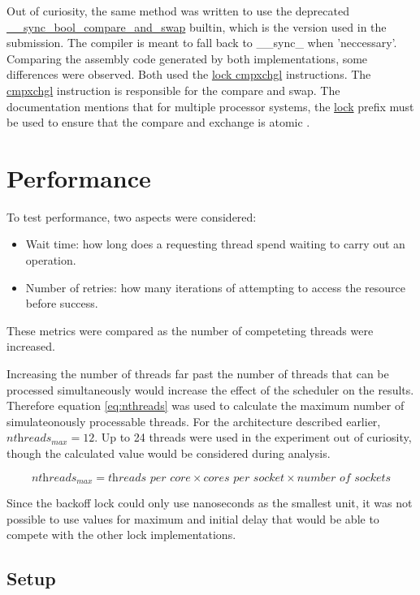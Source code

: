 \documentclass[12pt]{article}
\begin{document}
Out of curiosity, the same method was written to use the deprecated \url{__sync_bool_compare_and_swap} builtin, which is the version used in the submission. The compiler is meant to fall back to \_\_sync\_ when 'neccessary'. Comparing the assembly code generated by both implementations, some differences were observed. Both used the \url{lock cmpxchgl} instructions. The \url{cmpxchgl} instruction is responsible for the compare and swap. The documentation mentions that for multiple processor systems, the \url{lock} prefix must be used to ensure that the compare and exchange is atomic \cite{intelAtomic}.

\section{Performance}

To test performance, two aspects were considered:

\begin{itemize}
\item Wait time: how long does a requesting thread spend waiting to carry out an operation.
\item Number of retries: how many iterations of attempting to access the resource before success.
\end{itemize}

\noindent These metrics were compared as the number of competeting threads were increased.

Increasing the number of threads far past the number of threads that can be processed simultaneously would increase the effect of the scheduler on the results. Therefore equation \ref{eq:nthreads} was used to calculate the maximum number of simulateonously processable threads. For the architecture described earlier, $\textit{nthreads}_\textit{max} = 12 $. Up to 24 threads were used in the experiment out of curiosity, though the calculated value would be considered during analysis.

\begin{equation}
\label{eq:nthreads}
	\textit{nthreads}_\textit{max} =
	 \textit{threads per core} \times \textit{cores per socket} \times \textit{number of sockets}
\end{equation}

Since the backoff lock could only use nanoseconds as the smallest unit, it was not possible to use values for maximum and initial delay that would be able to compete with the other lock implementations.

\subsection{Setup}
\end{document}
